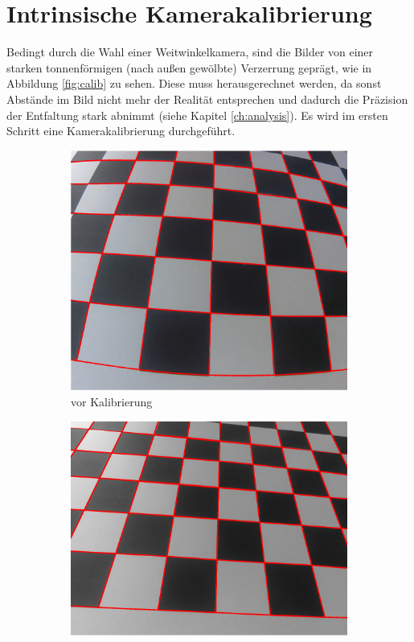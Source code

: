 \section{Intrinsische Kamerakalibrierung}
\label{s:intrinsic}
Bedingt durch die Wahl einer Weitwinkelkamera, sind die Bilder von einer starken tonnenförmigen (nach außen gewölbte) Verzerrung geprägt, wie in Abbildung \ref{fig:calib} zu sehen. Diese muss herausgerechnet werden, da sonst Abstände im Bild nicht mehr der Realität entsprechen und dadurch die Präzision der Entfaltung stark abnimmt (siehe Kapitel \ref{ch:analysis}). Es wird im ersten Schritt eine Kamerakalibrierung durchgeführt.


\begin{figure}[!htb]
	\centering
\begin{subfigure}{.5\textwidth}
	\centering
	\includegraphics[scale=.35]{images/calibrationRaspi.eps}
	\caption{vor Kalibrierung}
	\label{fig:calibDist}
\end{subfigure}%
\begin{subfigure}{.5\textwidth}
	\centering
	\includegraphics[scale=.4]{images/calibrationRaspi2.eps}

\end{subfigure}
\end{figure}
